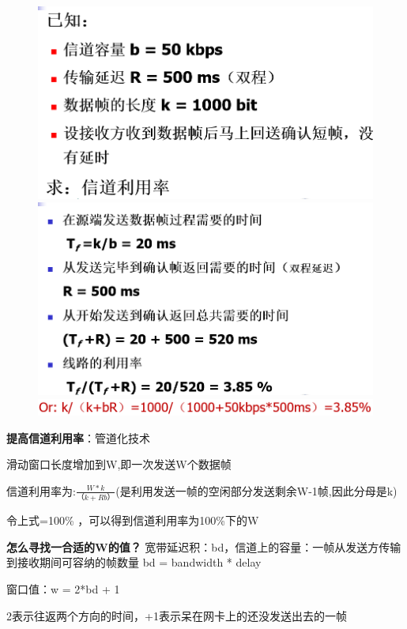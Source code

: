 \documentclass[UTF8,a4paper]{ctexart}
\begin{document}
\begin{figure}[H]
  \centering
  \includegraphics[scale = 0.3]{assets/jisuanjiwangluo_6ec33.png}
  \includegraphics[scale = 0.3]{assets/jisuanjiwangluo_a9eea.png}
  \includegraphics[scale = 0.3]{assets/jisuanjiwangluo_4b94f.png}
\end{figure}


\textbf{提高信道利用率}：管道化技术

滑动窗口长度增加到W,即一次发送W个数据帧

信道利用率为:$\frac{W*k}{（k + Rb）}$(是利用发送一帧的空闲部分发送剩余W-1帧,因此分母是k)

令上式=100\% ，可以得到信道利用率为100\%下的W

\textbf{怎么寻找一合适的W的值？}
宽带延迟积：bd，信道上的容量：一帧从发送方传输到接收期间可容纳的帧数量 bd = bandwidth * delay

窗口值：w = 2*bd + 1

2表示往返两个方向的时间，+1表示呆在网卡上的还没发送出去的一帧
\end{document}
